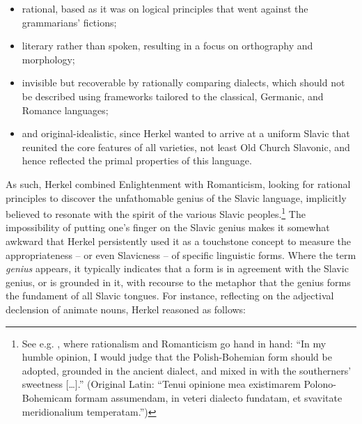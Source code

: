 \begin{itemize}
    \item{rational, based as it was on logical principles that went against the grammarians’ fictions;}
    \item{literary rather than spoken, resulting in a focus on orthography and morphology;}
    \item{invisible but recoverable by rationally comparing dialects, which should not be described using frameworks tailored to the classical, Germanic, and Romance languages;}
    \item{and original-idealistic, since Herkel wanted to arrive at a uniform Slavic that reunited the core features of all varieties, not least Old Church Slavo\-nic, and hence reflected the primal properties of this language.}
\end{itemize}

As such, Herkel combined Enlightenment with Romanticism, looking for rational principles to discover the unfathomable genius of the Slavic language, implicitly believed to resonate with the spirit of the various Slavic peoples.\footnote{See e.g. \citet[144]{herkel_elementa_1826}, where rationalism and Romanticism go hand in hand: “In my humble opinion, I would judge that the Polish-Bohemian form should be adopted, grounded in the ancient dialect, and mixed in with the southerners’ sweetness […].” (Original Latin: “Tenui opinione mea existimarem Polono-Bohemicam formam assumendam, in veteri dialecto fundatam, et svavitate meridionalium temperatam.”)} The impossibility of putting one’s finger on the Slavic genius makes it somewhat awkward that Herkel persistently used it as a touchstone concept to measure the appropriateness – or even Slavicness – of specific linguistic forms. Where the term \textit{genius} appears, it typically indicates that a form is in agreement with the Slavic genius, or is grounded in it, with recourse to the metaphor that the genius forms the fundament of all Slavic tongues. For instance, reflecting on the adjectival declension of animate nouns, Herkel reasoned as follows:

